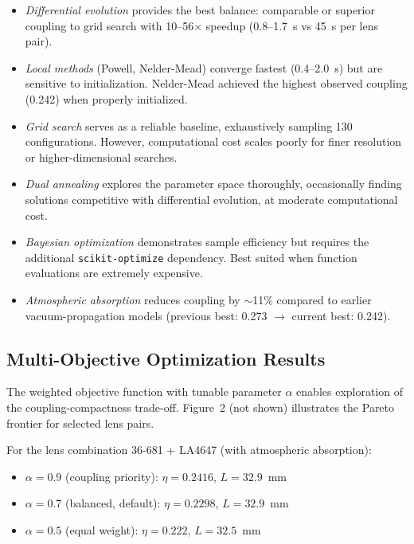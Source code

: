 \begin{itemize}[leftmargin=*]
    \item \textit{Differential evolution} provides the best balance: comparable or superior coupling to grid search with 10--56$\times$ speedup (0.8--1.7~s vs 45~s per lens pair).
    
    \item \textit{Local methods} (Powell, Nelder-Mead) converge fastest (0.4--2.0~s) but are sensitive to initialization. Nelder-Mead achieved the highest observed coupling (0.242) when properly initialized.
    
    \item \textit{Grid search} serves as a reliable baseline, exhaustively sampling 130 configurations. However, computational cost scales poorly for finer resolution or higher-dimensional searches.
    
    \item \textit{Dual annealing} explores the parameter space thoroughly, occasionally finding solutions competitive with differential evolution, at moderate computational cost.
    
    \item \textit{Bayesian optimization} demonstrates sample efficiency but requires the additional \texttt{scikit-optimize} dependency. Best suited when function evaluations are extremely expensive.
    
    \item \textit{Atmospheric absorption} reduces coupling by $\sim$11\% compared to earlier vacuum-propagation models (previous best: 0.273 $\rightarrow$ current best: 0.242).
\end{itemize}

\subsection{Multi-Objective Optimization Results}

The weighted objective function with tunable parameter $\alpha$ enables exploration of the coupling-compactness trade-off. Figure~2 (not shown) illustrates the Pareto frontier for selected lens pairs.

For the lens combination 36-681 + LA4647 (with atmospheric absorption):
\begin{itemize}[leftmargin=*]
    \item $\alpha = 0.9$ (coupling priority): $\eta = 0.2416$, $L = 32.9$~mm
    \item $\alpha = 0.7$ (balanced, default): $\eta = 0.2298$, $L = 32.9$~mm  
    \item $\alpha = 0.5$ (equal weight): $\eta = 0.222$, $L = 32.5$~mm
\end{itemize}


